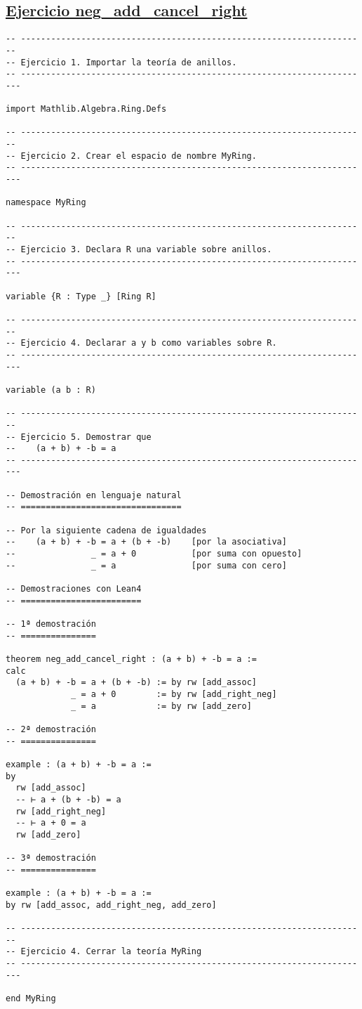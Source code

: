 \subsection{\href{./src/Basicos/neg\_add\_cancel\_right.lean}{Ejercicio neg\_add\_cancel\_right}}
\label{sec:orgbd4f58f}
\begin{verbatim}
-- ---------------------------------------------------------------------
-- Ejercicio 1. Importar la teoría de anillos.
-- ----------------------------------------------------------------------

import Mathlib.Algebra.Ring.Defs

-- ---------------------------------------------------------------------
-- Ejercicio 2. Crear el espacio de nombre MyRing.
-- ----------------------------------------------------------------------

namespace MyRing

-- ---------------------------------------------------------------------
-- Ejercicio 3. Declara R una variable sobre anillos.
-- ----------------------------------------------------------------------

variable {R : Type _} [Ring R]

-- ---------------------------------------------------------------------
-- Ejercicio 4. Declarar a y b como variables sobre R.
-- ----------------------------------------------------------------------

variable (a b : R)

-- ---------------------------------------------------------------------
-- Ejercicio 5. Demostrar que
--    (a + b) + -b = a
-- ----------------------------------------------------------------------

-- Demostración en lenguaje natural
-- ================================

-- Por la siguiente cadena de igualdades
--    (a + b) + -b = a + (b + -b)    [por la asociativa]
--               _ = a + 0           [por suma con opuesto]
--               _ = a               [por suma con cero]

-- Demostraciones con Lean4
-- ========================

-- 1ª demostración
-- ===============

theorem neg_add_cancel_right : (a + b) + -b = a :=
calc
  (a + b) + -b = a + (b + -b) := by rw [add_assoc]
             _ = a + 0        := by rw [add_right_neg]
             _ = a            := by rw [add_zero]

-- 2ª demostración
-- ===============

example : (a + b) + -b = a :=
by
  rw [add_assoc]
  -- ⊢ a + (b + -b) = a
  rw [add_right_neg]
  -- ⊢ a + 0 = a
  rw [add_zero]

-- 3ª demostración
-- ===============

example : (a + b) + -b = a :=
by rw [add_assoc, add_right_neg, add_zero]

-- ---------------------------------------------------------------------
-- Ejercicio 4. Cerrar la teoría MyRing
-- ----------------------------------------------------------------------

end MyRing
\end{verbatim}


